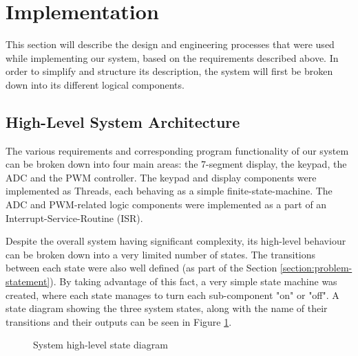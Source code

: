 \section{Implementation}

This section will describe the design and engineering processes that were used while implementing our system, based on the requirements described above. In order to simplify and structure its description, the system will first be broken down into its different logical components.


\subsection{High-Level System Architecture}


The various requirements and corresponding program functionality of our system can be broken down into four main areas: the 7-segment display, the keypad, the ADC and the PWM controller. The keypad and display components were implemented as Threads, each behaving as a simple finite-state-machine. The ADC and PWM-related logic components were implemented as a part of an Interrupt-Service-Routine (ISR).


Despite the overall system having significant complexity, its high-level behaviour can be broken down into a very limited number of states. The transitions between each state were also well defined (as part of the Section \ref{section:problem-statement}). By taking advantage of this fact, a very simple state machine was created, where each state manages to turn each sub-component "on" or "off". A state diagram showing the three system states, along with the name of their transitions and their outputs can be seen in Figure \ref{fig:high-level-state-diagram}.


\begin{figure}[h]
\centering
{}
\caption{System high-level state diagram}
\label{fig:high-level-state-diagram}
\end{figure}





